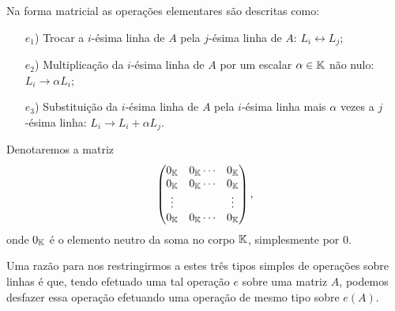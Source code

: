 Na forma matricial as opera\c{c}\~oes elementares s\~ao descritas como:
\begin{itemize}
	\item[$e_1$)] Trocar a $i$-\'esima linha de $A$ pela $j$-\'esima linha de $A$: $L_i \leftrightarrow L_j$;
	\item[$e_2$)] Multiplica\c{c}\~ao da $i$-\'esima linha de $A$ por um escalar $\alpha \in \mathbb{K}$ n\~ao nulo: $L_i \rightarrow \alpha L_i$;
	\item[$e_3$)] Substitui\c{c}\~ao da $i$-\'esima linha de $A$ pela $i$-\'esima linha mais $\alpha$ vezes a $j$-\'esima linha: $L_i \rightarrow L_i + \alpha L_j$.
\end{itemize}

\begin{observacao}
Denotaremos a matriz
\[
\begin{pmatrix}
0_{\mathbb{K}} & 0_{\mathbb{K}} \cdots & 0_{\mathbb{K}}\\
0_{\mathbb{K}} & 0_{\mathbb{K}} \cdots & 0_{\mathbb{K}}\\
\vdots & & \vdots\\
0_{\mathbb{K}} & 0_{\mathbb{K}} \cdots & 0_{\mathbb{K}}
\end{pmatrix},
\]
onde $0_{\mathbb{K}}$ \'e o elemento neutro da soma no corpo $\mathbb{K}$, simplesmente por $0$.
\end{observacao}

Uma raz\~ao para nos restringirmos a estes tr\^es tipos simples de opera\c{c}\~oes sobre linhas \'e que, tendo efetuado uma tal opera\c{c}\~ao $e$ sobre uma matriz $A$, podemos desfazer essa opera\c{c}\~ao efetuando uma opera\c{c}\~ao de mesmo tipo sobre $e(A)$.

